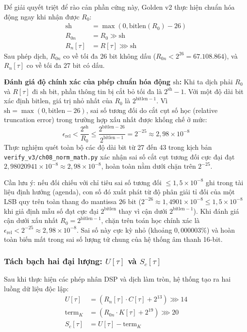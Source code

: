 \begin{itemize}[leftmargin=1.5em, itemsep=2pt]
    Để giải quyết triệt để rào cản phần cứng này, Golden v2 thực hiện chuẩn hóa động ngay khi nhận được $R_0$:
    \begin{align}
    \text{sh} &= \max(0, \text{bitlen}(R_0) - 26) \label{eq:ch08_sh_def} \\
    R_{0n} &= R_0 \gg \text{sh} \label{eq:ch08_r0n_def} \\
    R_n[\tau] &= R[\tau] \ggg \text{sh} \label{eq:ch08_rn_def}
    \end{align}
    Sau phép dịch, $R_{0n}$ co về tối đa $26\text{ bit}$ không dấu ($R_{0n} < 2^{26} = 67.108.864$), và $R_n[\tau]$ co về tối đa $27\text{ bit}$ có dấu.
\end{itemize}

\begin{physicalinsight}
\textbf{Đánh giá độ chính xác của phép chuẩn hóa động $\text{sh}$:}
Khi ta dịch phải $R_0$ và $R[\tau]$ đi $\text{sh}$ bit, phần thông tin bị cắt bỏ tối đa là $2^{\text{sh}} - 1$. Với một độ dài bit xác định $\text{bitlen}$, giá trị nhỏ nhất của $R_0$ là $2^{\text{bitlen}-1}$. Vì $\text{sh} = \max(0, \text{bitlen} - 26)$, sai số tương đối do cắt cụt số học (relative truncation error) trong trường hợp xấu nhất được khống chế ở mức:
\begin{equation}
\epsilon_{\text{rel}} < \frac{2^{\text{sh}}}{R_0} \le \frac{2^{\text{bitlen}-26}}{2^{\text{bitlen}-1}} = 2^{-25} \approx 2{,}98 \times 10^{-8}
\end{equation}
Thực nghiệm quét toàn bộ các độ dài bit từ 27 đến 43 trong kịch bản \texttt{verify\_v3/ch08\_norm\_math.py} xác nhận sai số cắt cụt tương đối cực đại đạt $2{,}98020941 \times 10^{-8} \approx 2{,}98 \times 10^{-8}$, hoàn toàn nằm dưới chặn trên $2^{-25}$.

Cần lưu ý: nếu đối chiếu với chỉ tiêu sai số tương đối $\le 1{,}5 \times 10^{-8}$ ghi trong tài liệu định hướng (agenda), con số đó xuất phát từ độ phân giải tỉ đối của một LSB quy trên toàn thang đo mantissa $26\text{ bit}$ ($2^{-26} \approx 1{,}4901 \times 10^{-8} \le 1{,}5 \times 10^{-8}$ khi giả định mẫu số đạt cực đại $2^{\text{bitlen}}$ thay vì cận dưới $2^{\text{bitlen}-1}$). Khi đánh giá cận dưới xấu nhất $R_0 = 2^{\text{bitlen}-1}$, chặn trên toán học chính xác là $\epsilon_{\text{rel}} < 2^{-25} \approx 2{,}98 \times 10^{-8}$. Sai số này cực kỳ nhỏ (khoảng $0{,}000003\%$) và hoàn toàn biến mất trong sai số lượng tử chung của hệ thống âm thanh 16-bit.
\end{physicalinsight}

\subsubsection*{Tách bạch hai đại lượng: $U[\tau]$ và $S_c[\tau]$}
Sau khi thực hiện các phép nhân DSP và dịch làm tròn, hệ thống tạo ra hai luồng dữ liệu độc lập:
\begin{align}
U[\tau] &= (R_n[\tau] \cdot C[\tau] + 2^{13}) \ggg 14 \label{eq:ch08_u_def} \\
\text{term}_K &= (R_{0n} \cdot K[\tau] + 2^{19}) \ggg 20 \label{eq:ch08_termk_def} \\
S_c[\tau] &= U[\tau] - \text{term}_K \label{eq:ch08_sc_def}
\end{align}


